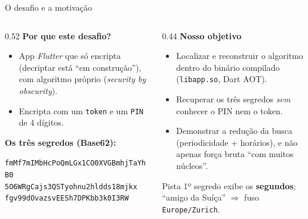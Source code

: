 \documentclass[aspectratio=169]{beamer}
\begin{document}
\begin{frame}{O desafio e a motivação}
  \begin{columns}[T]
    \begin{column}{0.52\textwidth}
      \textbf{Por que este desafio?}
      \begin{itemize}
        \item App \emph{Flutter} que \alert{só encripta} (decriptar está ``em
              construção''), com algoritmo próprio (\emph{security by obscurity}).
        \item Encripta com um \texttt{token} e um \texttt{PIN} de 4 dígitos.
      \end{itemize}
      \textbf{Os três segredos (Base62):}
      {\scriptsize
      \begin{block}{}
        \texttt{fmMf7mIMbHcPoQmLGx1CO0XVGBmhjTaYhB0}\\
        \texttt{5O6WRgCajs3QSTyohnu2hldds18mjkx}\\
        \texttt{fgv99dOvazsvEESh7DPKbb3k0I3RW}
      \end{block}}
    \end{column}
    \begin{column}{0.44\textwidth}
      \textbf{Nosso objetivo}
      \begin{itemize}
        \item \alert{Localizar e reconstruir} o algoritmo dentro do binário
              compilado (\texttt{libapp.so}, Dart AOT).
        \item Recuperar os três segredos \emph{sem} conhecer o PIN nem o token.
        \item Demonstrar a \alert{redução da busca} (periodicidade + horários),
              e não apenas força bruta ``com muitos núcleos''.
      \end{itemize}
      \begin{block}{Pista}
        1º segredo exibe os \textbf{segundos}; ``amigo da Suíça''
        $\Rightarrow$ fuso \texttt{Europe/Zurich}.
      \end{block}
    \end{column}
  \end{columns}
\end{frame}
\end{document}
